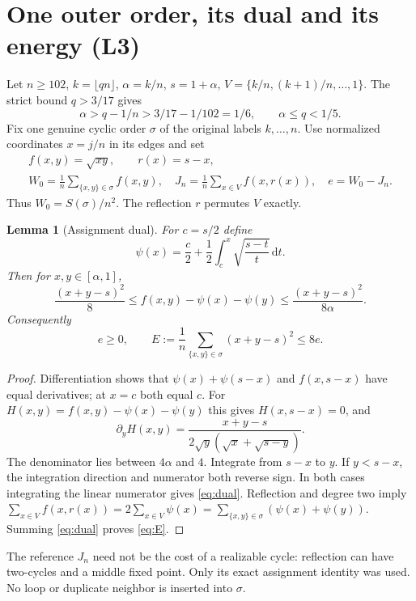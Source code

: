 \documentclass[11pt,a4paper]{article}
\newtheorem{lemma}[theorem]{Lemma}
\theoremstyle{remark}\newtheorem{remark}[theorem]{Remark}
\newcommand{\dd}{\,\mathrm d}
\begin{document}
\section{One outer order, its dual and its energy (L3)}\label{sec:dual}
Let $n\ge102$, $k=\lfloor qn\rfloor$, $\alpha=k/n$, $s=1+\alpha$,
$V=\{k/n,(k+1)/n,\ldots,1\}$. The strict bound $q>3/17$ gives
\begin{equation}\label{eq:gridgate}
\alpha>q-1/n>3/17-1/102=1/6,\qquad \alpha\le q<1/5.
\end{equation}
Fix one genuine cyclic order $\sigma$ of the original labels $k,\ldots,n$.
Use normalized coordinates $x=j/n$ in its edges and set
\[
\begin{gathered}
f(x,y)=\sqrt{xy},\qquad r(x)=s-x,\\
W_0=\frac1n\sum_{\{x,y\}\in\sigma} f(x,y),\quad
J_n=\frac1n\sum_{x\in V} f(x,r(x)),\quad e=W_0-J_n.
\end{gathered}
\]
Thus $W_0=S(\sigma)/n^2$. The reflection $r$ permutes $V$ exactly.

\begin{lemma}[Assignment dual]\label{lem:dual}
For $c=s/2$ define
\[
\psi(x)=\frac c2+\frac12\int_c^x\sqrt{\frac{s-t}{t}}\dd t.
\]
Then for $x,y\in[\alpha,1]$,
\begin{equation}\label{eq:dual}
\frac{(x+y-s)^2}{8}\le f(x,y)-\psi(x)-\psi(y)
\le\frac{(x+y-s)^2}{8\alpha}.
\end{equation}
Consequently
\begin{equation}\label{eq:E}
e\ge0,\qquad E:=\frac1n\sum_{\{x,y\}\in\sigma}(x+y-s)^2\le8e.
\end{equation}
\end{lemma}
\begin{proof}
Differentiation shows that $\psi(x)+\psi(s-x)$ and $f(x,s-x)$ have
equal derivatives; at $x=c$ both equal $c$. For
$H(x,y)=f(x,y)-\psi(x)-\psi(y)$ this gives $H(x,s-x)=0$, and
\[
\partial_yH(x,y)=
\frac{x+y-s}{2\sqrt y(\sqrt x+\sqrt{s-y})}.
\]
The denominator lies between $4\alpha$ and $4$. Integrate from $s-x$
to $y$. If $y<s-x$, the integration direction and numerator both
reverse sign. In both cases integrating the linear numerator gives
\eqref{eq:dual}. Reflection and degree two imply
$\sum_{x\in V}f(x,r(x))=2\sum_{x\in V}\psi(x)
=\sum_{\{x,y\}\in\sigma}(\psi(x)+\psi(y))$.
Summing \eqref{eq:dual} proves \eqref{eq:E}.
\end{proof}
The reference $J_n$ need not be the cost of a realizable cycle:
reflection can have two-cycles and a middle fixed point. Only its exact
assignment identity was used. No loop or duplicate neighbor is inserted
into $\sigma$.
\end{document}
